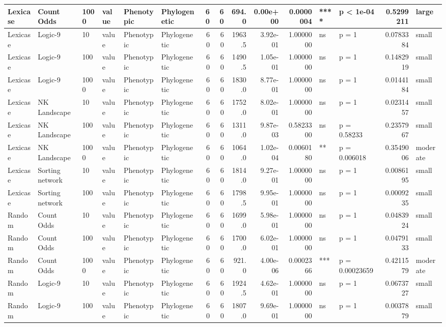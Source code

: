\documentclass[]{book}
\begin{document}
\begin{table}
\begin{tabular}[t]{l|l|l|l|l|l|r|r|r|r|r|l|l|r|l}
\hline
Lexicase & Count Odds & 1000 & value & Phenotypic & Phylogenetic & 60 & 60 & 694.0 & 0.00e+00 & 0.0000004 & **** & p < 1e-04 & 0.5299211 & large\\
\hline
Lexicase & Logic-9 & 10 & value & Phenotypic & Phylogenetic & 60 & 60 & 1963.5 & 3.92e-01 & 1.0000000 & ns & p = 1 & 0.0783384 & small\\
\hline
Lexicase & Logic-9 & 100 & value & Phenotypic & Phylogenetic & 60 & 60 & 1490.5 & 1.05e-01 & 1.0000000 & ns & p = 1 & 0.1482919 & small\\
\hline
Lexicase & Logic-9 & 1000 & value & Phenotypic & Phylogenetic & 60 & 60 & 1830.0 & 8.77e-01 & 1.0000000 & ns & p = 1 & 0.0144184 & small\\
\hline
Lexicase & NK Landscape & 10 & value & Phenotypic & Phylogenetic & 60 & 60 & 1752.0 & 8.02e-01 & 1.0000000 & ns & p = 1 & 0.0231457 & small\\
\hline
Lexicase & NK Landscape & 100 & value & Phenotypic & Phylogenetic & 60 & 60 & 1311.0 & 9.87e-03 & 0.5823300 & ns & p = 0.58233 & 0.2357967 & small\\
\hline
Lexicase & NK Landscape & 1000 & value & Phenotypic & Phylogenetic & 60 & 60 & 1064.0 & 1.02e-04 & 0.0060180 & ** & p = 0.006018 & 0.3549006 & moderate\\
\hline
Lexicase & Sorting network & 10 & value & Phenotypic & Phylogenetic & 60 & 60 & 1814.0 & 9.27e-01 & 1.0000000 & ns & p = 1 & 0.0086195 & small\\
\hline
Lexicase & Sorting network & 100 & value & Phenotypic & Phylogenetic & 60 & 60 & 1798.5 & 9.95e-01 & 1.0000000 & ns & p = 1 & 0.0009235 & small\\
\hline
Random & Count Odds & 10 & value & Phenotypic & Phylogenetic & 60 & 60 & 1699.0 & 5.98e-01 & 1.0000000 & ns & p = 1 & 0.0483924 & small\\
\hline
Random & Count Odds & 100 & value & Phenotypic & Phylogenetic & 60 & 60 & 1700.0 & 6.02e-01 & 1.0000000 & ns & p = 1 & 0.0479133 & small\\
\hline
Random & Count Odds & 1000 & value & Phenotypic & Phylogenetic & 60 & 60 & 921.0 & 4.00e-06 & 0.0002366 & *** & p = 0.00023659 & 0.4211579 & moderate\\
\hline
Random & Logic-9 & 10 & value & Phenotypic & Phylogenetic & 60 & 60 & 1924.5 & 4.62e-01 & 1.0000000 & ns & p = 1 & 0.0673727 & small\\
\hline
Random & Logic-9 & 100 & value & Phenotypic & Phylogenetic & 60 & 60 & 1807.0 & 9.69e-01 & 1.0000000 & ns & p = 1 & 0.0037879 & small\\

\end{tabular}
\end{table}
\end{document}
